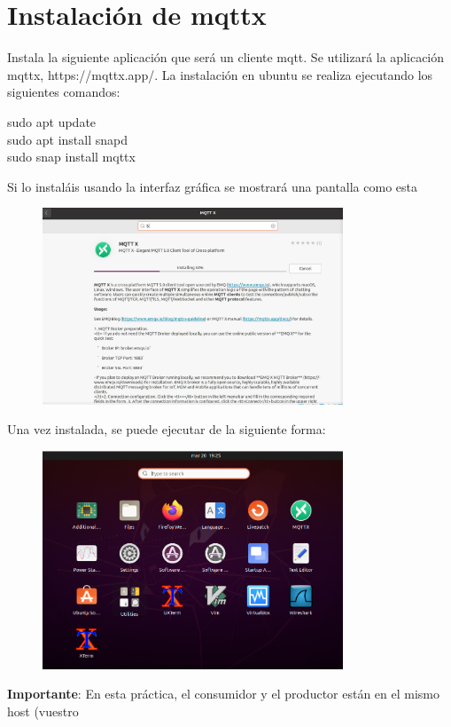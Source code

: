 \documentclass[12pt, a4paper]{report}
\begin{document}
\section{Instalación de mqttx}
Instala la siguiente aplicación que será un cliente mqtt. Se utilizará la aplicación mqttx,
https://mqttx.app/. La instalación en ubuntu se realiza ejecutando los siguientes comandos:\\
\begin{center}
	sudo apt update\\
	sudo apt install snapd\\
	sudo snap install mqttx
\end{center}
Si lo instaláis usando la interfaz gráfica se mostrará una pantalla como esta
\begin{figure}[H]
	\centering
	\includegraphics[width=0.8\textwidth]{enun1}
\end{figure}
Una vez instalada, se puede ejecutar de la siguiente forma:
\begin{figure}[H]
	\centering
	\includegraphics[width=0.8\textwidth]{enun2}
\end{figure}
\textbf{Importante}: En esta práctica, el consumidor y el productor están en el mismo host (vuestro
\end{document}
